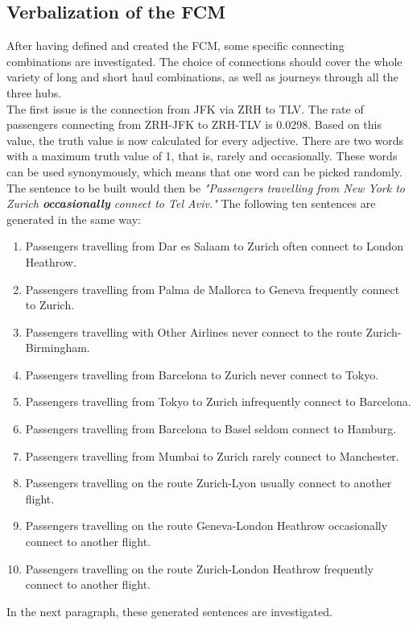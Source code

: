 \documentclass[conference]{IEEEtran}
\begin{document}
\subsection{Verbalization of the FCM}
\label{subsec:verbalization}
After having defined and created the FCM, some specific connecting combinations are investigated. The choice of connections should cover the whole variety of long and short haul combinations, as well as journeys through all the three hubs.\\
The first issue is the connection from JFK via ZRH to TLV. The rate of passengers connecting from ZRH-JFK to ZRH-TLV is 0.0298. Based on this value, the truth value is now calculated for every adjective. There are two words with a maximum truth value of 1, that is, rarely and occasionally. These words can be used synonymously, which means that one word can be picked randomly. The sentence to be built would then be \newline \emph{"Passengers travelling from New York to Zurich \textbf{occasionally} connect to Tel Aviv."} \newline The following ten sentences are generated in the same way:
\begin{enumerate}
\item Passengers travelling from Dar es Salaam to Zurich often connect to London Heathrow.
\item Passengers travelling from Palma de Mallorca to Geneva frequently connect to Zurich.
\item Passengers travelling with Other Airlines never connect to the route Zurich-Birmingham.
\item Passengers travelling from Barcelona to Zurich never connect to Tokyo.
\item Passengers travelling from Tokyo to Zurich infrequently connect to Barcelona.
\item Passengers travelling from Barcelona to Basel seldom connect to Hamburg.
\item Passengers travelling from Mumbai to Zurich rarely connect to Manchester.
\item Passengers travelling on the route Zurich-Lyon usually connect to another flight.
\item Passengers travelling on the route Geneva-London Heathrow occasionally connect to another flight.
\item Passengers travelling on the route Zurich-London Heathrow frequently connect to another flight.
\end{enumerate} 
In the next paragraph, these generated sentences are investigated.
\end{document}
